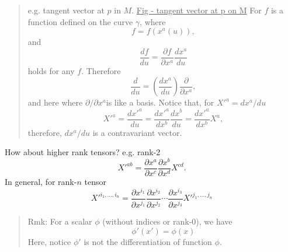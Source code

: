 \begin{quote}
	e.g. tangent vector at $p$ in $M$.
\underline{Fig - tangent vector at p on M}
For $f$ is a function defined on the curve $\gamma$, where
\begin{equation}
f = f(x^{a}(u)),
\end{equation}
and
\begin{equation}
\frac{df}{du} = \frac{\partial f}{\partial x^{a}} \frac{dx^a}{du}
\end{equation}
holds for any $f$. Therefore
\begin{equation}
\frac{d}{du} = \left(\frac{dx^{a}}{du}\right)\frac{\partial}{\partial x^{a}},
\end{equation}
and here where $\partial / \partial x^{a}$​ is like a basis.
Notice that, for $X'^{a} = dx^a/du$
\begin{equation}
X'^{a} = \frac{dx'^a}{du} = \frac{dx'^{a}}{dx^{b}}\frac{dx^{b}}{du} = \frac{dx'^{a}}{dx^{b}}X^{a},
\end{equation}
therefore, $dx^a/du$ is a contravariant vector.
\end{quote}

How about higher rank tensors? e.g. rank-2
\begin{equation}
X'^{ab} = \frac{\partial x^{a}}{\partial x^{c}}\frac{\partial x^{b}}{\partial x^{d}}X^{cd}.
\end{equation}
In general, for rank-$n$ tensor
\begin{equation}
X'^{i_1,\ldots,i_n} =
\frac{\partial x^{i_1}}{\partial x^{j_1}}
\frac{\partial x^{i_2}}{\partial x^{j_2}}
\cdots
\frac{\partial x^{i_3}}{\partial x^{j_3}}
X'^{j_1,\ldots,j_n}
\end{equation}


\begin{quote}
	Rmk:
For a scalar $\phi$ (without indices or rank-0), we have
\begin{equation}
\phi'(x') = \phi(x)
\end{equation}
Here, notice $\phi'$ is not the differentiation of function $\phi$.
\end{quote}


